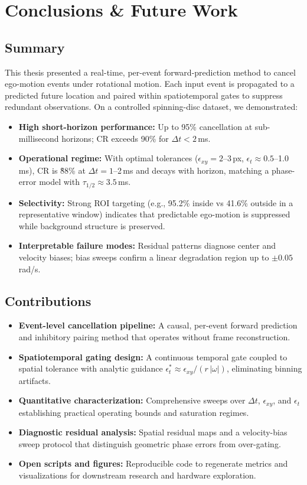 \chapter{Conclusions \& Future Work}\label{chap:conclusion}

\section{Summary}
This thesis presented a real-time, per-event forward-prediction method to cancel ego-motion events under rotational motion. Each input event is propagated to a predicted future location and paired within spatiotemporal gates to suppress redundant observations. On a controlled spinning-disc dataset, we demonstrated:
\begin{itemize}
  \item \textbf{High short-horizon performance:} Up to 95\% cancellation at sub-millisecond horizons; CR exceeds 90\% for $\Delta t<2$\,ms.
  \item \textbf{Operational regime:} With optimal tolerances ($\epsilon_{xy}=2$--3\,px, $\epsilon_t\approx 0.5$--1.0\,ms), CR is \~88\% at $\Delta t=1$--2\,ms and decays with horizon, matching a phase-error model with $\tau_{1/2}\approx 3.5$\,ms.
  \item \textbf{Selectivity:} Strong ROI targeting (e.g., 95.2\% inside vs 41.6\% outside in a representative window) indicates that predictable ego-motion is suppressed while background structure is preserved.
  \item \textbf{Interpretable failure modes:} Residual patterns diagnose center and velocity biases; bias sweeps confirm a linear degradation region up to $\pm 0.05$\,rad/s.
\end{itemize}

\section{Contributions}
\begin{itemize}
  \item \textbf{Event-level cancellation pipeline:} A causal, per-event forward prediction and inhibitory pairing method that operates without frame reconstruction.
  \item \textbf{Spatiotemporal gating design:} A continuous temporal gate coupled to spatial tolerance with analytic guidance $\epsilon_t^{*} \approx \epsilon_{xy}/(r\,|\omega|)$, eliminating binning artifacts.
  \item \textbf{Quantitative characterization:} Comprehensive sweeps over $\Delta t$, $\epsilon_{xy}$, and $\epsilon_t$ establishing practical operating bounds and saturation regimes.
  \item \textbf{Diagnostic residual analysis:} Spatial residual maps and a velocity-bias sweep protocol that distinguish geometric phase errors from over-gating.
  \item \textbf{Open scripts and figures:} Reproducible code to regenerate metrics and visualizations for downstream research and hardware exploration.
\end{itemize}

